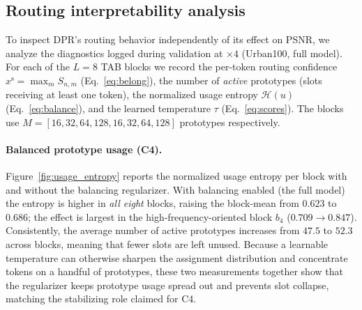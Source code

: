 \subsection{Routing interpretability analysis}
\label{sec:routing_analysis}

To inspect DPR's routing behavior independently of its effect on PSNR, we analyze
the diagnostics logged during validation at $\times4$
(Urban100, full model). For each of the $L{=}8$ TAB blocks we record the per-token
routing confidence $x^{\mathrm{s}}=\max_m S_{n,m}$ (Eq.~\eqref{eq:belong}), the
number of \emph{active} prototypes (slots receiving at least one token), the
normalized usage entropy $\mathcal{H}(u)$ (Eq.~\eqref{eq:balance}), and the learned
temperature $\tau$ (Eq.~\eqref{eq:scores}). The blocks use
$M=[16,32,64,128,16,32,64,128]$ prototypes respectively.

\paragraph{Balanced prototype usage (C4).}
Figure~\ref{fig:usage_entropy} reports the normalized usage entropy per block with
and without the balancing regularizer. With balancing enabled (the full model) the
entropy is higher in \emph{all eight} blocks, raising the block-mean from $0.623$
to $0.686$; the effect is largest in the high-frequency-oriented block $b_4$
($0.709\!\rightarrow\!0.847$). Consistently, the average number of active
prototypes increases from $47.5$ to $52.3$ across blocks, meaning that fewer slots are
left unused. Because a learnable temperature can otherwise sharpen the assignment
distribution and concentrate tokens on a handful of prototypes, these two
measurements together show that the regularizer keeps prototype usage spread out
and prevents slot collapse, matching the stabilizing role claimed for C4.

